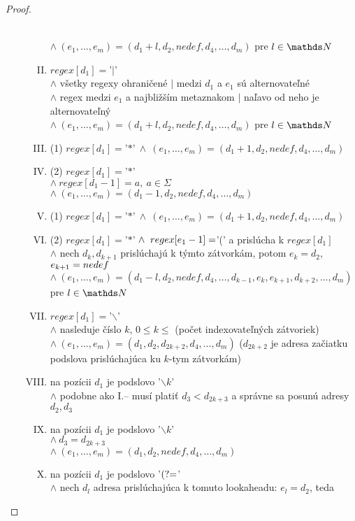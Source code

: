 \begin{proof}
\begin{description}
\begin{enumerate}[I.]
\\ $\wedge~ (e_1,\dots, e_m)=(d_1+l,d_2,nedef,d_4,\dots,d_m)$ pre $l\in\N$
\item $regex[d_1] =$'$|$'
\\ $\wedge$ všetky regexy ohraničené $|$ medzi $d_1$ a $e_1$ sú alternovateľné
\\ $\wedge$ regex medzi $e_1$ a najbližším metaznakom $|$ naľavo od neho je alternovateľný
\\ $\wedge~ (e_1,\dots, e_m)=(d_1+l,d_2,nedef,d_4,\dots,d_m)$ pre $l\in\N$
\item (1) $regex[d_1]=$'$*$'$~\wedge~(e_1,\dots,e_m)=(d_1+1,d_2,nedef,d_4,\dots,d_m)$
\setcounter{enumi}{5}
\item (2) $regex[d_1]=$'$*$'
\\ $\wedge~ regex[d_1-1]=a,~a\in\Sigma$
\\ $\wedge~(e_1,\dots,e_m)=(d_1-1,d_2,nedef,d_4,\dots,d_m)$
\item (1) $regex[d_1]=$'$*$'$~\wedge~(e_1,\dots,e_m)=(d_1+1,d_2,nedef,d_4,\dots,d_m)$
\setcounter{enumi}{6}
\item (2) $regex[d_1]=$'$*$'$ \\ \wedge~regex[e_1-1]=$'(' a prislúcha k $regex[d_1]$ 
\\ $\wedge$ nech $d_k,d_{k+1}$ prislúchajú k týmto zátvorkám, potom $e_k=d_2$, $e_{k+1}=\nobreak nedef$ 
\\ $\wedge ~(e_1,\dots,e_m)=(d_1-l,d_2,nedef,d_4,\dots,d_{k-1},e_k,e_{k+1},d_{k+2},\dots, d_m)$ pre $l\in\nobreak\N$
\item $regex[d_1] =$'$\backslash$' 
\\ $\wedge$ nasleduje číslo $k$, $0\leq k \leq$ (počet indexovateľných zátvoriek) 
\\ $\wedge ~ (e_1,\dots,e_m)= (d_1,d_2,d_{2k+2},d_4,\dots,d_m)$ ($d_{2k+2}$ je adresa začiatku podslova prislúchajúca ku $k$-tym zátvorkám)
\item na pozícii $d_1$ je podslovo '$\backslash k$'
\\ $\wedge$ podobne ako I.-- musí platiť $d_3<d_{2k+3}$ a správne sa posunú adresy $d_2,d_3$
\item na pozícii $d_1$ je podslovo '$\backslash k$' 
\\ $\wedge ~ d_3=d_{2k+3}$ 
\\ $\wedge ~(e_1,\dots, e_m)=(d_1,d_2,nedef,d_4,\dots,d_m)$
\item na pozícii $d_1$ je podslovo '$\text{(?=}$' 
\\ $\wedge$ nech $d_l$ adresa prislúchajúca k tomuto lookaheadu: $e_l=d_2$, teda 

\end{enumerate}
\end{description}
\end{proof}
